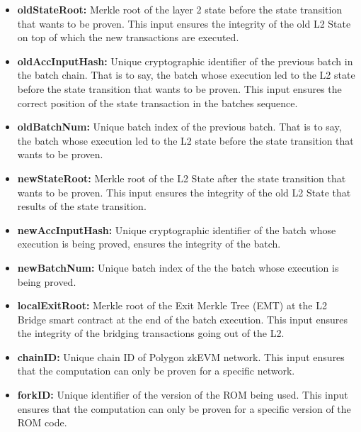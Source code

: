 \begin{itemize}
    \item \textbf{oldStateRoot:} Merkle root of the layer 2 state before the state transition that wants to be proven. This input ensures the integrity of the old L2 State on top of which the new transactions are executed.
    \item \textbf{oldAccInputHash:} Unique cryptographic identifier of the previous batch in the batch chain. That is to say, the batch whose execution led to the L2 state before the state transition that wants to be proven. This input ensures the correct position of the state transaction in the batches sequence.
    \item \textbf{oldBatchNum:} Unique batch index of the previous batch. That is to say, the batch whose execution led to the L2 state before the state transition that wants to be proven.
    \item \textbf{newStateRoot:} Merkle root of the L2 State after the state transition that wants to be proven. This input ensures the integrity of the old L2 State that results of the state transition.
    \item \textbf{newAccInputHash:} Unique cryptographic identifier of the batch whose execution is being proved, ensures the integrity of the batch.
    \item \textbf{newBatchNum:} Unique batch index of the the batch whose execution is being proved.
    \item \textbf{localExitRoot:} Merkle root of the Exit Merkle Tree (EMT) at the L2 Bridge smart contract at the end of the batch execution. 
    This input ensures the integrity of the bridging transactions going out of the L2. 
    \item \textbf{chainID:} Unique chain ID of Polygon zkEVM network. 
    This input ensures that the computation can only be proven for a specific network.
    \item \textbf{forkID:} Unique identifier of the version of the ROM being used. 
    This input ensures that the computation can only be proven for a specific version of the ROM code.
\end{itemize}

